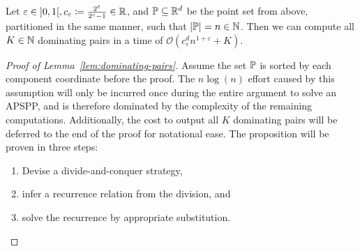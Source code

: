 \begin{lemma}\label{lem:dominating-pairs}
    Let $\varepsilon \in \interval[open]{0}{1}, c_\varepsilon \coloneqq \frac{2^\varepsilon}{2^\varepsilon - 1} \in \bb{R}$, and $\mathbb{P} \subseteq \mathbb{R}^d$ be the point set from above, partitioned in the same manner, such that $\left\lvert\mathbb{P}\right\rvert_{} = n \in \mathbb{N}$.
    Then we can compute all $K \in \mathbb{N}$ dominating pairs in a time of $\mathcal{O}\left( c_\varepsilon^d n^{1 + \varepsilon} + K \right)$.
\end{lemma}

\begin{proof}[Proof of Lemma~\ref{lem:dominating-pairs}]
    Assume the set $\mathbb{P}$ is sorted by each component coordinate before the proof.
    The $n \log(n)$ effort caused by this assumption will only be incurred once during the entire argument to solve an APSPP, and is therefore dominated by the complexity of the remaining computations.
    Additionally, the cost to output all $K$ dominating pairs will be deferred to the end of the proof for notational ease.
    The proposition will be proven in three steps:
    \begin{enumerate}
        \item Devise a divide-and-conquer strategy,
        \item infer a recurrence relation from the division, and
        \item solve the recurrence by appropriate substitution.
    \end{enumerate}


\end{proof}
